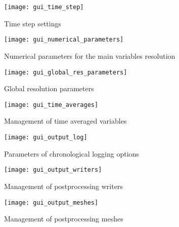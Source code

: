 {{\begin{figure}[!ht]
\begin{center}
\texttt{[image: gui\_time\_step]}
\caption{Time step settings}
\label{fig:21_GUI}
\end{center}
\end{figure}

\begin{figure}[!ht]
\begin{center}
\texttt{[image: gui\_numerical\_parameters]}
\caption{Numerical parameters for the main variables resolution}
\label{fig:22_GUI}
\end{center}
\end{figure}

\begin{figure}[!ht]
\begin{center}
\texttt{[image: gui\_global\_res\_parameters]}
\caption{Global resolution parameters}
\label{fig:23_GUI}
\end{center}
\end{figure}

\begin{figure}[!ht]
\begin{center}
\texttt{[image: gui\_time\_averages]}
\caption{Management of time averaged variables}
\label{fig:24_GUI}
\end{center}
\end{figure}

\begin{figure}[!ht]
\begin{center}
\texttt{[image: gui\_output\_log]}
\caption{Parameters of chronological logging options}
\label{gui_output_log}
\end{center}
\end{figure}

\begin{figure}[!ht]
\begin{center}
\texttt{[image: gui\_output\_writers]}
\caption{Management of postprocessing writers}
\label{gui_output_writers}
\end{center}
\end{figure}

\begin{figure}[!ht]
\begin{center}
\texttt{[image: gui\_output\_meshes]}
\caption{Management of postprocessing meshes}
\label{gui_output_meshes}
\end{center}
\end{figure}

}}
